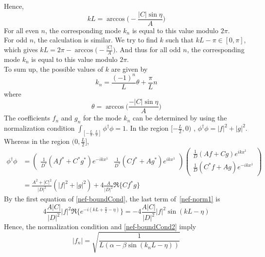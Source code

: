 Hence,
\begin{equation*}
kL = \arccos \big(-\frac{|C|\sin\eta}{A}\big)
\end{equation*}
For all even $n$, the corresponding mode $k_n$ is equal to this value modulo $2 \pi$. \\
For odd $n$, the calculation is similar.
We try to find $k$ such that $kL - \pi \in [0, \pi]$, which gives $kL = 2\pi - \arccos \big(-\frac{|C|}{A}\big)$. 
And thus for all odd $n$, the corresponding mode $k_n$ is equal to this value modulo $2 \pi$.\\
To sum up, the possible values of $k$ are given by
\begin{equation*}
k_{n} = \frac{(-1)^n}{L}\theta  + \frac{\pi}{L}n 
\end{equation*}
where
\begin{equation*}
\theta = \arccos\bigg( \frac{-|C| \sin \eta}{A} \bigg)
\end{equation*}
The coefficients $f_{n}$ and $g_{n}$ for the mode $k_{ n}$ can be determined by using the normalization condition  $\int_{[-\frac{L}{2}, \frac{L}{2}]}\phi^\dagger \phi = 1$. 
In the region $[-\frac{L}{2}, 0)$ , $\phi^\dagger \phi = | f |^2 + | g |^2$. Whereas in the region $(0, \frac{L}{2}]$, 
\begin{equation}\label{nef-norm1}
\begin{split}
\phi^\dagger \phi & = \begin{pmatrix}
\frac{1}{D^*}(Af^* +  C^*g^*)e^{-ikx^1}  & \frac{1}{D^*}(C f^* + Ag^*)e^{ikx^1} 
\end{pmatrix}\begin{pmatrix}
\frac{1}{D}(Af +  Cg)e^{ikx^1}  \\
 \frac{1}{D}(C^* f + Ag)e^{-ikx^1} 
\end{pmatrix}  \\
 & =
\frac{A^2 + | C|^2}{| D |^2}(|f|^2 + |g|^2) + 4\frac{A}{|D|^2}\Re \{C f^* g\}
\end{split}
\end{equation}
By the first equation of \cref{nef-boundCond}, the last term of~\cref{nef-norm1} is 
\begin{equation*}
4\frac{A |C|}{|D|^2}| f|^2\Re\{e ^{-i(kL + \frac{\pi}{2} - \eta)}\} = 
- 4\frac{A |C|}{|D|^2}| f|^2\sin( kL - \eta) 
\end{equation*}
Hence, the normalization condition and \cref{nef-boundCond2} imply
\begin{equation*}
 | f_{n} | =  \sqrt{\frac{1}{L(\alpha - \beta \sin (k_{n} L - \eta))}}  
\end{equation*}
